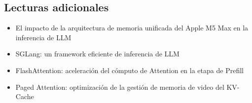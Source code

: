 \documentclass[a4paper]{article}
\begin{document}
\subsection{Lecturas adicionales}
\begin{itemize}
  \item El impacto de la arquitectura de memoria unificada del Apple M5 Max en la inferencia de LLM
  \item SGLang: un framework eficiente de inferencia de LLM
  \item FlashAttention: aceleración del cómputo de Attention en la etapa de Prefill
  \item Paged Attention: optimización de la gestión de memoria de video del KV-Cache
\end{itemize}
\end{document}
